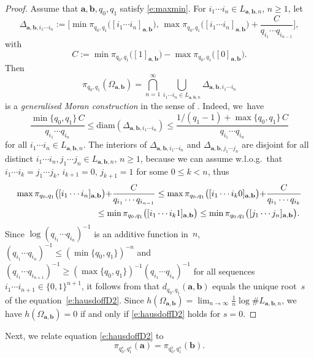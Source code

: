 \documentclass{amsart}
\theoremstyle{definition}
\numberwithin{equation}{section}
\newcommand{\ba}{\mathbf{a}}
\newcommand{\bb}{\mathbf{b}}
\begin{document}
\begin{proof}
Assume that $\ba,\bb,q_0,q_1$ satisfy \eqref{e:maxmin}.
For $i_1 \cdots i_n \in L_{\ba,\bb,n}$, $n \ge 1$, let
\[
\Delta_{\ba,\bb,i_1\cdots i_n} := \bigg[\min \pi_{q_0,q_1}\big([i_1\cdots i_n]_{\ba,\bb}\big),\, \max \pi_{q_0,q_1}\big([i_1\cdots i_n]_{\ba,\bb}\big) + \frac{C}{q_{i_1}\cdots q_{i_{n-1}}}\bigg],
\]
with
\[
C := \min \pi_{q_0,q_1}\big([1]_{\ba,\bb}\big) - \max  \pi_{q_0,q_1}\big([0]_{\ba,\bb}\big).
\]
Then 
\[
\pi_{q_0,q_1}(\Omega_{\ba,\bb}) = \bigcap_{n=1}^\infty \bigcup_{i_1\cdots i_n \in L_{\ba,\bb,n}} \Delta_{\ba,\bb,i_1\cdots i_n}
\]
is a \emph{generalised Moran construction} in the sense of \cite[Section~2.1]{Barreira1996}.
Indeed, we~have
\[
\frac{\min\{q_0,q_1\}\,C}{q_{i_1}\cdots q_{i_n}} \le \mathrm{diam}(\Delta_{\ba,\bb,i_1\cdots i_n}) \le \frac{1/(q_1{-}1){+}\max\{q_0,q_1\}\,C}{q_{i_1}\cdots q_{i_n}}
\]
for all $i_1\cdots i_n \in L_{\ba,\bb,n}$.  The interiors of $\Delta_{\ba,\bb,i_1\cdots i_n}$ and $\Delta_{\ba,\bb,j_1\cdots j_n}$ are disjoint for all distinct $i_1 \cdots i_n, j_1 \cdots j_n \in L_{\ba,\bb,n}$, $n \ge 1$, because we can assume w.l.o.g.\ that $i_1 \cdots i_k = j_1 \cdots j_k$, $i_{k+1} = 0$, $j_{k+1} = 1$ for some $0 \le k < n$, thus
\[
\begin{aligned}
\max \pi_{q_0,q_1}\big([i_1\cdots i_n]_{\ba,\bb}\big) {+} \frac{C}{q_{i_1}\cdots q_{i_{n-1}}} & \le \max \pi_{q_0,q_1}\big([i_1\cdots i_k0]_{\ba,\bb}\big) {+} \frac{C}{q_{i_1}\cdots q_{i_k}} \\
& \hspace{-7em} \le \min \pi_{q_0,q_1}\big([i_1\cdots i_k1]_{\ba,\bb}\big) \le \min \pi_{q_0,q_1}\big([j_1\cdots j_n]_{\ba,\bb}\big).
\end{aligned}
\]
Since $\log (q_{i_1} \cdots q_{i_n})^{-1}$ is an additive function in~$n$, $(q_{i_1} \cdots q_{i_n})^{-1} \le (\min\{q_0,q_1\})^{-n}$ and $(q_{i_1} \cdots q_{i_{n+1}})^{-1} \ge (\max\{q_0,q_1\})^{-1} (q_{i_1} \cdots q_{i_n})^{-1}$ for all sequences $i_1\cdots i_{n+1} \in \{0,1\}^{n+1}$, it follows from \cite[Theorem~2.1]{Barreira1996} that $d_{q_0,q_1}(\ba,\bb)$ equals the unique root~$s$ of the equation~\eqref{e:hausdoffD2}.
Since $h(\Omega_{\ba,\bb}) = \lim_{n\to\infty} \frac{1}{n} \log \# L_{\ba,\bb,n}$, we have $h(\Omega_{\ba,\bb}) = 0$ if and only if \eqref{e:hausdoffD2} holds for $s = 0$.
\end{proof}

Next, we relate equation \eqref{e:hausdoffD2} to
\begin{equation} \label{e:abs}
\pi_{q_0^s,q_1^s}(\ba) = \pi_{q_0^s,q_1^s}(\bb).
\end{equation}
\end{document}
